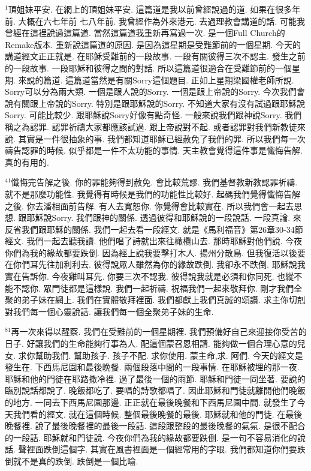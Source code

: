 \documentclass{book}
\begin{document}
$^{1}$頂姐妹平安.
在網上的頂姐妹平安.
這篇道是我以前曾經說過的道.
如果在很多年前.
大概在六七年前 七八年前.
我曾經作為外來港元.
去過理教會講道的話.
可能我曾經在這裡說過這篇道.
當然這篇道我重新再寫過一次.
是一個Full Church的Remake版本.
重新說這篇道的原因.
是因為這星期是受難節前的一個星期.
今天的講道經文正正就是.
在耶穌受難前的一段故事.
一段有關彼得三次不認主.
發生之前的一段故事.
一段耶穌和彼得之間的對話.
所以這篇道很適合在受難節前的一個星期.
來說的篇道.
這篇道當然是有關Sorry這個題目.
正如上星期梁國權老師所說.
Sorry可以分為兩大類.
一個是跟人說的Sorry.
一個是跟上帝說的Sorry.
今次我們會說有關跟上帝說的Sorry.
特別是跟耶穌說的Sorry.
不知道大家有沒有試過跟耶穌說Sorry.
可能比較少.
跟耶穌說Sorry好像有點奇怪.
一般來說我們跟神說Sorry.
我們稱之為認罪.
認罪祈禱大家都應該試過.
跟上帝說對不起.
或者認罪對我們新教徒來說.
其實是一件很抽象的事.
我們都知道耶穌已經赦免了我們的罪.
所以我們每一次禱告認罪的時候.
似乎都是一件不太功能的事情.
天主教會覺得這件事是懺悔告解.
真的有用的.

$^{41}$懺悔完告解之後.
你的罪能夠得到赦免.
會比較荒謬.
我們基督教新教認罪祈禱.
就不是那麼功能性.
我覺得有時候是我們的功能性比較好.
起碼我們覺得懺悔告解之後.
你去潘相面前告解.
有人去寬恕你.
你覺得會比較實在.
所以我們會一起去思想.
跟耶穌說Sorry.
我們跟神的關係.
透過彼得和耶穌說的一段說話.
一段真論.
來反省我們跟耶穌的關係.
我們一起去看一段經文.
就是《馬利福音》第26章30-34節經文.
我們一起去聽我讀.
他們唱了詩就出來往橄欖山去.
那時耶穌對他們說.
今夜你們為我的緣故都要跌倒.
因為經上說我要擊打木人.
揚州分散鳥.
但我復活以後要在你們耳先往加利利去.
彼得說眾人雖然為你的緣故跌倒.
我卻永不跌倒.
耶穌說我實在告訴你.
今夜雞叫耳先.
你要三次不認我.
彼得說我就是必須和你同死.
也縱不能不認你.
眾門徒都是這樣說.
我們一起祈禱.
祝福我們一起來敬拜你.
剛才我們全聚的弟子妹在網上.
我們在實體敬拜裡面.
我們都獻上我們真誠的頌讚.
求主你切剋對我們每一個心靈說話.
讓我們每一個全聚弟子妹的生命.

$^{81}$再一次來得以醒察.
我們在受難前的一個星期裡.
我們預備好自己來迎接你受苦的日子.
好讓我們的生命能夠行事為人.
配這個蒙召恩相請.
能夠做一個合理心意的兒女.
求你幫助我們.
幫助孩子.
孩子不配.
求你使用.
蒙主命,求.
阿們.
今天的經文是發生在.
下西馬尼園和最後晚餐.
兩個段落中間的一段事情.
在耶穌被埋的那一夜.
耶穌和他的門徒在耶路撒冷裡.
過了最後一個的雨節.
耶穌和門徒一同坐著.
要說的臨別說話都說了.
晚飯都吃了.
要唱的詩歌都唱了.
因此耶穌和門徒就離開他們晚飯的地方.
一同去下西馬尼園那邊.
正正就在最後晚餐和下西馬尼園中間.
就發生了今天我們看的經文.
就在這個時候.
整個最後晚餐的最後.
耶穌就和他的門徒.
在最後晚餐裡.
說了最後晚餐裡的最後一段話.
這段跟整段的最後晚餐的氣氛.
是很不配合的一段話.
耶穌就和門徒說.
今夜你們為我的緣故都要跌倒.
是一句不容易消化的說話.
聲裡面跌倒這個字.
其實在風書裡面是一個經常用的字眼.
我們都知道你們要跌倒就不是真的跌倒.
跌倒是一個比喻.
\end{document}
